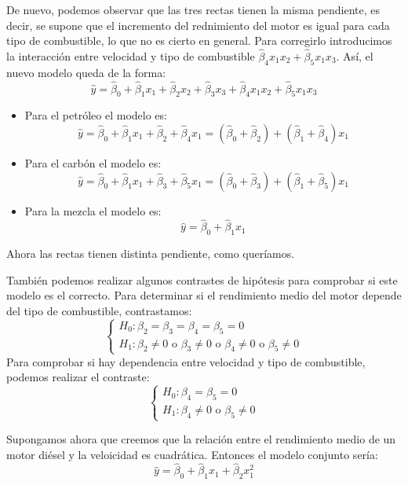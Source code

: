 \begin{example}
    De nuevo, podemos observar que las tres rectas tienen la misma pendiente, es decir, se supone que el incremento del rednimiento del motor es igual para cada tipo de combustible, lo que no es cierto en general.
    Para corregirlo introducimos la interacción entre velocidad y tipo de combustible $\hat{\beta}_4x_1x_2 + \hat{\beta}_5x_1x_3$.
    Así, el nuevo modelo queda de la forma:
    $$\hat{y} = \hat{\beta}_0 + \hat{\beta}_1x_1 + \hat{\beta}_2x_2 + \hat{\beta}_3x_3 + \hat{\beta}_4x_1x_2 + \hat{\beta}_5x_1x_3$$
    \begin{itemize}
        \item Para el petróleo el modelo es:
              $$\hat{y} = \hat{\beta}_0 + \hat{\beta}_1x_1 + \hat{\beta}_2 + \hat{\beta}_4x_1 = (\hat{\beta}_0 + \hat{\beta}_2) + (\hat{\beta}_1 + \hat{\beta}_4)x_1$$
        \item Para el carbón el modelo es:
              $$\hat{y} = \hat{\beta}_0 + \hat{\beta}_1x_1 + \hat{\beta}_3 + \hat{\beta}_5x_1 = (\hat{\beta}_0 + \hat{\beta}_3) + (\hat{\beta}_1 + \hat{\beta}_5)x_1$$
        \item Para la mezcla el modelo es:
              $$\hat{y} = \hat{\beta}_0 + \hat{\beta}_1x_1$$
    \end{itemize}
    Ahora las rectas tienen distinta pendiente, como queríamos.

    También podemos realizar algunos contrastes de hipótesis para comprobar si este modelo es el correcto.
    Para determinar si el rendimiento medio del motor depende del tipo de combustible, contrastamos:
    $$\begin{cases}
            H_0: \beta_2 = \beta_3 = \beta_4 = \beta_5 = 0 \\
            H_1: \beta_2 \neq 0 \text{ o } \beta_3 \neq 0 \text{ o } \beta_4 \neq 0 \text{ o } \beta_5 \neq 0
        \end{cases}$$
    Para comprobar si hay dependencia entre velocidad y tipo de combustible, podemos realizar el contraste:
    $$\begin{cases}
            H_0: \beta_4 = \beta_5 = 0 \\
            H_1: \beta_4 \neq 0 \text{ o } \beta_5 \neq 0
        \end{cases}$$

    Supongamos ahora que creemos que la relación entre el rendimiento medio de un motor diésel y la veloicidad es cuadrática.
    Entonces el modelo conjunto sería:
    $$\hat{y} = \hat{\beta}_0 + \hat{\beta}_1x_1 + \hat{\beta}_2x_1^2$$


\end{example}
